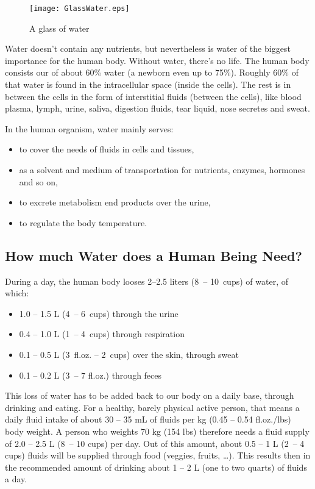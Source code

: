 \documentclass[../main.tex]{subfiles}
\begin{document}
\begin{figure}[htb!]
  \centering
\texttt{[image: GlassWater.eps]}
  \caption{A glass of water~\cite{GlassWater}}
\end{figure}



Water doesn't contain any nutrients, but nevertheless is water of the biggest importance for the human body.
Without water, there's no life.
The human body consists our of about 60\% water (a newborn even up to 75\%).
Roughly 60\% of that water is found in the intracellular space (inside the cells).
The rest is in between the cells in the form of interstitial fluids (between the cells),
like blood plasma, lymph, urine, saliva, digestion fluids, tear liquid, nose secretes and sweat.


In the human organism, water mainly serves:
\begin{itemize}
\item to cover the needs of fluids in cells and tissues,
\item as a solvent and medium of transportation for nutrients, enzymes, hormones and so on,
\item to excrete metabolism end products over the urine,
\item to regulate the body temperature.
\end{itemize}

\subsection{How much Water does a Human Being Need?}

During a day, the human body looses 2--2.5 liters (8\ -- 10\ cups) of water, of which:
\begin{itemize}
\item 1.0 -- 1.5 L (4\ -- 6\ cups) through the urine
\item 0.4 -- 1.0 L (1\ -- 4\ cups) through respiration
\item 0.1 -- 0.5 L (3\ fl.oz. -- 2\ cups) over the skin, through sweat
  \item 0.1 -- 0.2 L (3\ -- 7 fl.oz.) through feces
  \end{itemize}

  This loss of water has to be added back to our body on a daily base, through drinking and eating.
  For a healthy, barely physical active person, that means a daily fluid intake of about 30 -- 35 mL of fluids per kg (0.45 -- 0.54 fl.oz./lbs) body weight.
  A person who weights 70 kg (154 lbs) therefore needs a fluid supply of 2.0 -- 2.5 L (8\ -- 10 cups) per day.
  Out of this amount, about 0.5 -- 1 L (2\ -- 4 cups) fluids will be supplied through food (veggies, fruits, \ldots).
  This results then in the recommended amount of drinking about 1 -- 2 L (one to two quarts) of fluids a day.
\end{document}
